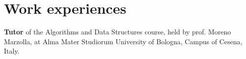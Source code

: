 \documentclass[curriculum-vitae-eng]{subfiles}
\begin{document}
	\section*{Work experiences}
	 \textbf{Tutor} of the Algorithms and Data Structures course, held by prof. Moreno Marzolla, at Alma Mater Studiorum University of Bologna, Campus of Cesena, Italy.
\end{document}
